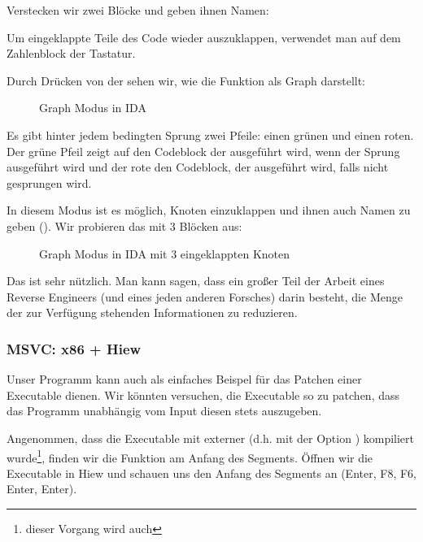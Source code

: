 Verstecken wir zwei Blöcke und geben ihnen Namen:



Um eingeklappte Teile des Code wieder auszuklappen, verwendet man \q{+} auf dem Zahlenblock der Tastatur.

\clearpage
Durch Drücken von der  sehen wir, wie \IDA die Funktion als Graph darstellt:

\begin{figure}[H]
\centering
{}
\caption{Graph Modus in IDA}
\label{fig:ex3_IDA_1}
\end{figure}
Es gibt hinter jedem bedingten Sprung zwei Pfeile: einen grünen und einen roten.
Der grüne Pfeil zeigt auf den Codeblock der ausgeführt wird, wenn der Sprung ausgeführt wird und der rote den Codeblock,
der ausgeführt wird, falls nicht gesprungen wird.

\clearpage
In diesem Modus ist es möglich, Knoten einzuklappen und ihnen auch Namen zu geben ().
Wir probieren das mit 3 Blöcken aus:

\begin{figure}[H]
\centering
{}
\caption{Graph Modus in IDA mit 3 eingeklappten Knoten}
\label{fig:ex3_IDA_2}
\end{figure}

Das ist sehr nützlich.
Man kann sagen, dass ein großer Teil der Arbeit eines Reverse Engineers (und eines jeden anderen Forsches) darin
besteht, die Menge der zur Verfügung stehenden Informationen zu reduzieren.



\clearpage
\subsubsection{MSVC: x86 + Hiew}
Unser Programm kann auch als einfaches Beispel für das Patchen einer Executable dienen.
Wir könnten versuchen, die Executable so zu patchen, dass das Programm unabhängig vom Input diesen stets auszugeben.

Angenommen, dass die Executable mit externer  (d.h. mit der Option ) kompiliert
wurde\footnote{dieser Vorgang wird auch }, finden wir die Funktion \main am Anfang des
 Segments. 
Öffnen wir die Executable in Hiew und schauen uns den Anfang des  Segments an (Enter, F8, F6, Enter, Enter).

